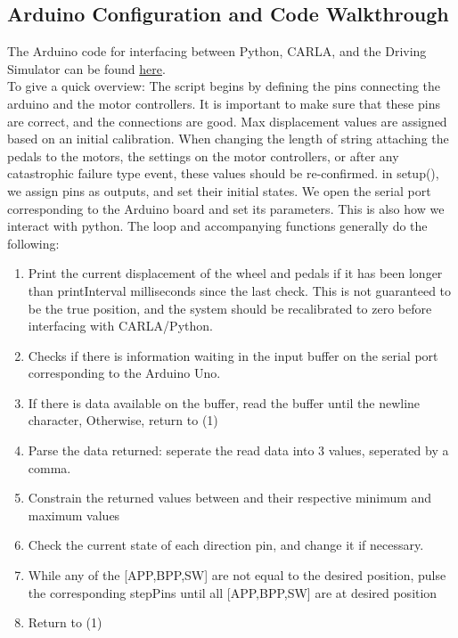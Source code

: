\documentclass{article}
\begin{document}
\subsection{Arduino Configuration and Code Walkthrough}
The Arduino code for interfacing between Python, CARLA, and the Driving Simulator can be found \href{https://github.com/hrwhite21/DriverlessDIL/blob/main/PythonToMotor/PythonToMotor.ino}{here}. 
\\
To give a quick overview: The script begins by defining the pins connecting the arduino and the motor controllers. It is important to make sure that these pins are correct, and the connections are good. Max displacement values are assigned based on an initial calibration. When changing the length of string attaching the pedals to the motors, the settings on the motor controllers, or after any catastrophic failure type event, these values should be re-confirmed. in setup(), we assign pins as outputs, and set their initial states. We open the serial port corresponding to the Arduino board and set its parameters. This is also how we interact with python. The loop and accompanying functions generally do the following: 
\begin{enumerate}
\item Print the current displacement of the wheel and pedals if it has been longer than printInterval milliseconds since the last check. This is not guaranteed to be the true position, and the system should be recalibrated to zero before interfacing with CARLA/Python.
\item Checks if there is information waiting in the input buffer on the serial port corresponding to the Arduino Uno. 
\item If there is data available on the buffer, read the buffer until the newline character, Otherwise, return to (1)
\item Parse the data returned: seperate the read data into 3 values, seperated by a comma.
\item Constrain the returned values between and their respective minimum and maximum values
\item Check the current state of each direction pin, and change it if necessary.
\item While any of the [APP,BPP,SW] are not equal to the desired position, pulse the corresponding stepPins until all [APP,BPP,SW] are at desired position
\item Return to (1) 
\end{enumerate}
\end{document}
